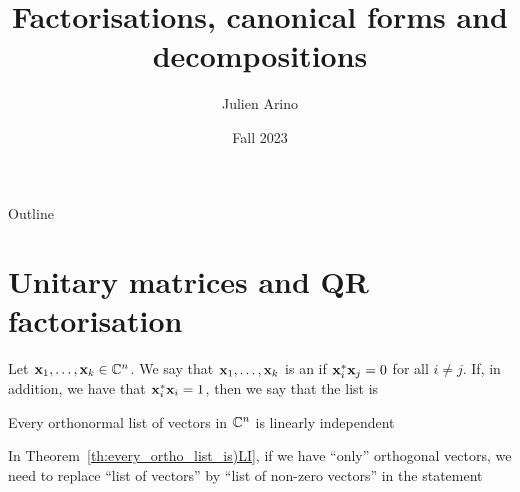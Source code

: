 \documentclass[aspectratio=169]{beamer}
\title{Factorisations, canonical forms and decompositions}
\author{Julien Arino}
\date{Fall 2023}
\begin{document}
\begin{frame}
	\titlepage
\end{frame}
\addtocounter{page}{-1}
  
  
\begin{frame}{Outline}
	  \tableofcontents[hideallsubsections]
\end{frame}
\addtocounter{page}{-1}


\section{Unitary matrices and QR factorisation}

\begin{frame}
\begin{definition}
Let $\mathbf{x}_1, \ldots, \mathbf{x}_k\in \mathbb{C}^n$. We say that $\mathbf{x}_1, \ldots, \mathbf{x}_k$ is an  if $\mathbf{x}_i^*\mathbf{x}_j=0$ for all $i \neq j$. If, in addition, we have that $\mathbf{x}_i^*\mathbf{x}_i=1$, then we say that the list is 
\end{definition}
\vfill
\begin{theorem}\label{th:every_ortho_list_is)LI}
Every orthonormal list of vectors in $\mathbb{C}^n$ is linearly independent
\end{theorem}
\vfill
\begin{remark}
In Theorem~\ref{th:every_ortho_list_is)LI}, if we have ``only'' orthogonal vectors, we need to replace ``list of vectors'' by ``list of non-zero vectors'' in the statement 
\end{remark}
\end{frame}
\end{document}
